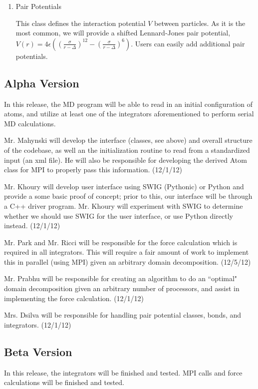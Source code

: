 \documentclass[10pt]{article}
\begin{document}
\begin{enumerate}
	\item{Pair Potentials} \par This class defines the interaction potential $V$ between particles. As it is the most common, we will provide a shifted Lennard-Jones pair potential, $V(r) = 4\epsilon \left( \left( \frac{\sigma}{r-\Delta} \right)^{12} - \left( \frac{\sigma}{r - \Delta} \right)^{6} \right)$. Users can easily add additional pair potentials.
\end{enumerate}

\subsection{Alpha Version}
In this release, the MD program will be able to read in an initial configuration of atoms, and utilize at least one of the integrators aforementioned to perform serial MD calculations.

Mr. Mahynski will develop the interface (classes, see above) and overall structure of the codebase, as well an the initialization routine to read from a standardized input (an xml file).  He will also be responsible for developing the derived Atom class for MPI to properly pass this information. (12/1/12)

Mr. Khoury will develop user interface using SWIG (Pythonic) or Python and provide a some basic proof of concept; prior to this, our interface will be through a C++ driver program. Mr. Khoury will experiment with SWIG to determine whether we should use SWIG for the user interface, or use Python directly instead. (12/1/12)

Mr. Park and Mr. Ricci will be responsible for the force calculation which is required in all integrators.  This will require a fair amount of work to implement this in parallel (using MPI) given an arbitrary domain decomposition. (12/5/12)

Mr. Prabhu will be responsible for creating an algorithm to do an ``optimal" domain decomposition given an arbitrary number of processors, and assist in implementing the force calculation.  (12/1/12)

Mrs. Dsilva will be responsible for handling pair potential classes, bonds, and integrators.  (12/1/12)

\subsection{Beta Version}
In this release, the integrators will be finished and tested.  MPI calls and force calculations will be finished and tested.
\end{document}
